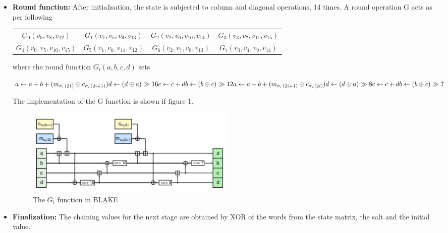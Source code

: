 \documentclass[12pt]{artikel3}                  %
\begin{document}
\begin{itemize}
\item {\bf Round function:} After initialisation, the state is subjected to column and diagonal operations, 14
times. A round operation G acts as per following

\begin{table}
  \begin{center}
    \begin{tabular}{ *{4}{c}}
    $ G_{0}(v_{0}, v_{8}, v_{12})$ & $G_{1}(v_{1}, v_{5}, v_{9}, v_{13})$ & $G_{2}(v_{2}, v_{6}, v_{10}, v_{14})$ & $G_{3}(v_{3}, v_{7}, v_{11}, v_{15}) $\\
$G_{4}(v_{0}, v_{5}, v_{10}, v_{15})$ & $G_{5}(v_{1}, v_{6}, v_{11}, v_{12})$ & $G_{6}(v_{2}, v_{7}, v_{8}, v_{13})$ & $G_{7}(v_{3}, v_{4}, v_{9}, v_{14})$
    \end{tabular}
  \end{center}
\end{table}

where the round function $G_{i}(a, b, c, d)$ sets

$
a \gets a + b + (m_{\sigma_{r}(21)} \oplus c_{\sigma_{r}(2i + 1)}) \\
d \gets (d \oplus a) \gg 16 \\
c \gets c + d \\
b \gets (b \oplus c) \gg 12 \\
a \gets a + b + (m_{\sigma_{r}(2i + 1)} \oplus c_{\sigma_{r}(2i)}) \\
d \gets (d \oplus a) \gg 8 \\
c \gets c + d \\
b \gets (b \oplus c) \gg 7
$

The implementation of the G function is shown if figure 1.
\begin{figure}[h]
  \begin{center}
    \includegraphics[width=4in]{blakeGfunction.jpg}
  \end{center}
  \caption{The $G_{i}$ function in BLAKE \cite{00002}}
  \label{fig:lab}
\end{figure}

\item {\bf Finalization:} The chaining values for the next stage are obtained by XOR of the words from the state 
matrix, the salt and the initial value.


\end{itemize}
\end{document}
